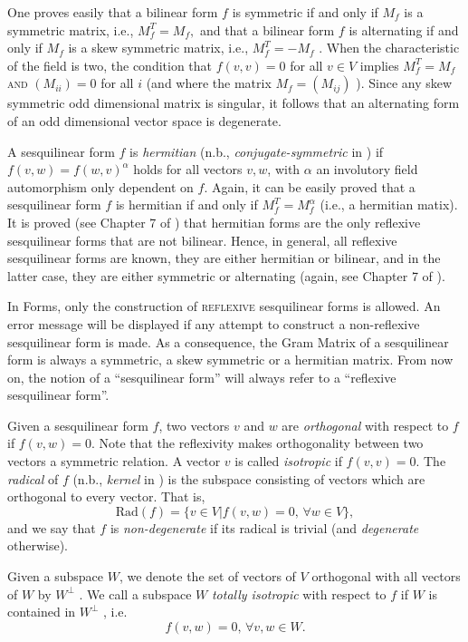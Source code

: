 \documentclass[a4paper,11pt]{report}
\begin{document}
{{ One proves easily that a bilinear form $f$ is symmetric if and only if $M_f$  is a symmetric matrix, i.e., $M_f^T=M_f,$  and that a bilinear form $f$ is alternating if and only if  $M_f$ is a skew symmetric matrix, i.e., $M_f^T=-M_f$ . When the characteristic of the field is two, the condition that $f(v,v)=0$ for all $v \in V$ implies $M_f^T=M_f$  \textsc{and} $(M_{ii})=0$  for all $i$ (and where the matrix  $M_f = (M_{ij})$ ). Since any skew symmetric odd dimensional matrix is singular, it follows
that an alternating form of an odd dimensional vector space is degenerate. 

 A sesquilinear form $f$ is \emph{hermitian} (n.b., \emph{conjugate-symmetric} in \cite{Atlas}) if $f(v,w)=f(w,v)^\alpha$  holds for all vectors $v,w$, with $\alpha$ an involutory field automorphism only dependent on $f$. Again, it can be easily proved that a sesquilinear form $f$ is hermitian if and only if  $M_f^T = M_f^{\alpha}$  (i.e., a hermitian matix). It is proved (see Chapter 7 of \cite{Taylor}) that hermitian forms are the only reflexive sesquilinear forms that are not
bilinear. Hence, in general, all reflexive sesquilinear forms are known, they
are either hermitian or bilinear, and in the latter case, they are either
symmetric or alternating (again, see Chapter 7 of \cite{Taylor}). 

 In \textsf{Forms}, only the construction of \textsc{reflexive} sesquilinear forms is allowed. An error message will be displayed if any
attempt to construct a non-reflexive sesquilinear form is made. As a
consequence, the Gram Matrix of a sesquilinear form is always a symmetric, a
skew symmetric or a hermitian matrix. From now on, the notion of a
``sesquilinear form'' will always refer to a ``reflexive sesquilinear form''. 

 Given a sesquilinear form $f$, two vectors $v$ and $w$ are \emph{orthogonal} with respect to $f$ if $f(v,w) = 0$. Note that the reflexivity makes orthogonality between two vectors a
symmetric relation. A vector $v$ is called \emph{isotropic} if $f(v,v)=0$. The \emph{radical} of $f$ (n.b., \emph{kernel} in \cite{Atlas}) is the subspace consisting of vectors which are orthogonal to every vector.
That is,  
\[\mathrm{Rad}(f) = \{v \in V | f(v,w) = 0,\, \forall w \in V\},\]
   and we say that $f$ is \emph{non-degenerate} if its radical is trivial (and \emph{degenerate} otherwise). 

Given a subspace $W$, we denote the set of vectors of $V$ orthogonal with all vectors of $W$ by $W^\perp$ . We call a subspace $W$ \emph{totally isotropic} with respect to $f$ if $W$ is contained in $W^\perp$ , i.e.  
\[f(v,w) = 0,\, \forall v,w \in W.\]
   

}}
\end{document}
